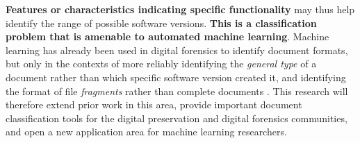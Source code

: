 \documentclass[12pt]{article}
\begin{document}
\textbf{Features or characteristics indicating specific functionality} may thus help identify the range of possible software versions. \textbf{This is a classification problem that is amenable to automated machine learning}. Machine learning has already been used in digital forensics to identify document formats, but only in the contexts of more reliably identifying the \emph{general type} of a document \cite{Mokhov.S-2008a-File} rather than which specific software version created it, and identifying the format of file \emph{fragments} rather than complete documents \cite{Li.Q-2010a-SVM,Roussev.V-2009a-File}. This research will therefore extend prior work in this area, provide important document classification tools for the digital preservation and digital forensics communities, and open a new application area for machine learning researchers.




\end{document}
